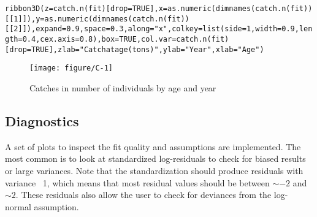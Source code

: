 \documentclass[a4paper,english,10pt]{article}\usepackage[]{graphicx}\usepackage[]{color}
\makeatletter
\def\maxwidth{ %
  \ifdim\Gin@nat@width>\linewidth
    \linewidth
  \else
    \Gin@nat@width
  \fi
}
\newcommand{\hlnum}[1]{\textcolor[rgb]{0.2,0.2,0.2}{#1}}%
\newcommand{\hlstr}[1]{\textcolor[rgb]{0.2,0.2,0.2}{#1}}%
\newcommand{\hlstd}[1]{\textcolor[rgb]{0,0,0}{#1}}%
\newcommand{\hlkwc}[1]{\textcolor[rgb]{0.361,0.506,0.596}{#1}}%
\newcommand{\hlkwd}[1]{\textcolor[rgb]{0.361,0.506,0.596}{#1}}%
\newenvironment{kframe}{%
 \def\at@end@of@kframe{}%
 \ifinner\ifhmode%
  \def\at@end@of@kframe{\end{minipage}}%
  \begin{minipage}{\columnwidth}%
 \fi\fi%
 \def\FrameCommand##1{\hskip\@totalleftmargin \hskip-\fboxsep
 \colorbox{shadecolor}{##1}\hskip-\fboxsep
     \hskip-\linewidth \hskip-\@totalleftmargin \hskip\columnwidth}%
 \MakeFramed {\advance\hsize-\width
   \@totalleftmargin\z@ \linewidth\hsize
   \@setminipage}}%
 {\par\unskip\endMakeFramed%
 \at@end@of@kframe}
\newenvironment{knitrout}{}{} %
\makeatother
\begin{document}
\begin{knitrout}
\color{fgcolor}\begin{kframe}
\begin{alltt}
\hlkwd{ribbon3D}\hlstd{(} \hlkwc{z} \hlstd{=} \hlkwd{catch.n}\hlstd{(fit)[}\hlkwc{drop}\hlstd{=}\hlnum{TRUE}\hlstd{],} \hlkwc{x}\hlstd{=} \hlkwd{as.numeric}\hlstd{(}\hlkwd{dimnames}\hlstd{(}\hlkwd{catch.n}\hlstd{(fit))[[}\hlnum{1}\hlstd{]]),} \hlkwc{y}\hlstd{=} \hlkwd{as.numeric}\hlstd{(}\hlkwd{dimnames}\hlstd{(}\hlkwd{catch.n}\hlstd{(fit))[[}\hlnum{2}\hlstd{]]) ,} \hlkwc{expand} \hlstd{=} \hlnum{0.9}\hlstd{,} \hlkwc{space} \hlstd{=} \hlnum{0.3}\hlstd{,} \hlkwc{along} \hlstd{=} \hlstr{"x"}\hlstd{,} \hlkwc{colkey} \hlstd{=} \hlkwd{list}\hlstd{(} \hlkwc{side}\hlstd{=}\hlnum{1}\hlstd{,} \hlkwc{width} \hlstd{=} \hlnum{0.9}\hlstd{,} \hlkwc{length} \hlstd{=} \hlnum{0.4}\hlstd{,} \hlkwc{cex.axis} \hlstd{=} \hlnum{0.8}\hlstd{),}\hlkwc{box} \hlstd{=} \hlnum{TRUE}\hlstd{,} \hlkwc{col.var}\hlstd{=}\hlkwd{catch.n}\hlstd{(fit)[}\hlkwc{drop}\hlstd{=}\hlnum{TRUE}\hlstd{] ,} \hlkwc{zlab}\hlstd{=}\hlstr{"Catch at age (tons)"}\hlstd{,} \hlkwc{ylab}\hlstd{=}\hlstr{"Year"}\hlstd{,} \hlkwc{xlab}\hlstd{=}\hlstr{"Age"}\hlstd{)}
\end{alltt}
\end{kframe}\begin{figure}[H]

{\centering \texttt{[image: figure/C-1]} 

}

\caption[Catches in number of individuals by age and year]{Catches in number of individuals by age and year\label{fig:C}}
\end{figure}


\end{knitrout}

\subsection{Diagnostics}

A set of plots to inspect the fit quality and assumptions are implemented. The most common is to look at standardized log-residuals to check for biased results or large variances. Note that the standardization should produce residuals with variance ~1, which means that most residual values should be between $\sim -2$ and $\sim 2$. These residuals also allow the user to check for deviances from the log-normal assumption.
\end{document}
